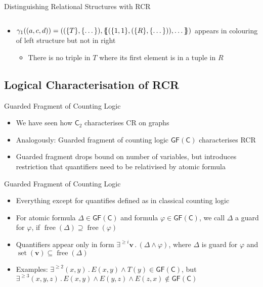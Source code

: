 \documentclass[aspectratio=169]{beamer}
\newcommand{\GFC}{\mathsf{GF}(\mathsf{C})}
\newcommand{\free}[1]{\operatorname{free}(#1)}
\newcommand{\set}{\operatorname{set}}
\newcommand{\C}[1]{\mathsf{C}_{#1}}
\renewcommand{\phi}{\varphi}
\def\multiset#1{\ensuremath{\left\{\kern-.35em\left\{#1\right\}\kern-.35em\right\}}}
\begin{document}
\begin{frame}{Distinguishing Relational Structures with RCR}
\begin{columns}
\begin{column}{0.5\textwidth}
			\end{column}
		\end{columns}
		\begin{itemize}
			\item $\gamma_1((a,c,d))=((\{T\},\{\dots\}), \multiset{(\{1,1\}, (\{R\},\{\dots\})), \dots})$ appears in colouring of left structure but not in right
			\begin{itemize}
				\item There is no triple in $T$ where its first element is in a tuple in $R$
			\end{itemize}	
		\end{itemize}
	\end{frame}
	
	\subsection{Logical Characterisation of RCR}
	
	\begin{frame}{Guarded Fragment of Counting Logic}
		\begin{itemize}
			\item We have seen how $\C{2}$ characterises CR on graphs
			\item Analogously: Guarded fragment of counting logic $\GFC$ characterises RCR
			\item Guarded fragment drops bound on number of variables, but introduces restriction that quantifiers need to be relativised by atomic formula
		\end{itemize}
		
		\begin{block}{Guarded Fragment of Counting Logic}
			\begin{itemize}
				\item Everything except for quantifies defined as in classical counting logic
				\item For atomic formula $\Delta\in\GFC$ and formula $\phi\in\GFC$, we call $\Delta$ a guard for $\phi$, if $\free{\Delta}\supseteq \free{\phi}$
				\item Quantifiers appear only in form $\exists^{\geq i} \mathbf v \operatorname{.} (\Delta \land \phi)$, where $\Delta$ is guard for $\phi$ and $\set(\mathbf v) \subseteq \free{\Delta}$
			\end{itemize}
		\end{block}
		\begin{itemize}
			\item Examples: $\exists^{\geq 2} (x,y) \operatorname{.}E(x,y)\land T(y)\in \GFC$, but $\exists^{\geq 3} (x,y,z) \operatorname{.} E(x,y) \land E(y,z) \land E(z,x)\notin \GFC$
		\end{itemize}
	\end{frame}
	
\end{document}
